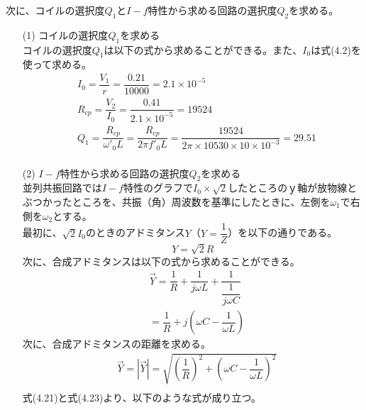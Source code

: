 \documentclass[12pt,a4paper]{jsarticle}
\numberwithin{equation}{section}
\numberwithin{figure}{section}
\numberwithin{table}{section}
\begin{document}
  次に、コイルの選択度$Q_1$と$I-f$特性から求める回路の選択度$Q_2$を求める。
  \begin{itemize}
    \item [(1)]コイルの選択度$Q_1$を求める\\コイルの選択度$Q_1$は以下の式から求めることができる。また、$I_0$は式(4.2)を使って求める。
    \begin{equation}
      \begin{split}
        &I_0=\dfrac{V_1}{r}=\dfrac{0.21}{10000}=2.1 \times 10^{-5}\\
        &R_{cp}=\dfrac{V_2}{I_0}=\dfrac{0.41}{2.1 \times 10^{-5}}=19524\\
        &Q_1=\dfrac{R_{cp}}{\omega'_0 L}=\dfrac{R_{cp}}{2 \pi f'_0 L}=\dfrac{19524}{2 \pi \times 10530 \times 10 \times 10^{-3}}=29.51\\
      \end{split}
    \end{equation}
    \item [(2)]$I-f$特性から求める回路の選択度$Q_2$を求める\\並列共振回路では$I-f$特性のグラフで$I_0 \times \sqrt{2}$したところのｙ軸が放物線とぶつかったところを、共振（角）周波数を基準にしたときに、左側を$\omega_1$で右側を$\omega_2$とする。\\最初に、$\sqrt{2}I_0$のときのアドミタンス$Y$（$Y=\dfrac{1}{Z}$）を以下の通りである。
    \begin{equation}
      Y=\sqrt{2}R
    \end{equation}
    次に、合成アドミタンスは以下の式から求めることができる。
    \begin{equation}
      \begin{split}
        &\vec{Y}=\dfrac{1}{R} + \dfrac{1}{j \omega L} + \dfrac{1}{\dfrac{1}{j \omega C}}\\
        &=\dfrac{1}{R} + j(\omega C - \dfrac{1}{\omega L})
      \end{split}
    \end{equation}
    次に、合成アドミタンスの距離を求める。
    \begin{equation}
      \begin{split}
        &\vec{Y}=|\vec{Y}|=\sqrt{(\dfrac{1}{R})^2 + (\omega C - \dfrac{1}{\omega L})^2}\\
      \end{split}
    \end{equation}
    式(4.21)と式(4.23)より、以下のような式が成り立つ。
    \begin{equation}
      \begin{split}

\end{split}
\end{equation}
\end{itemize}
\end{document}
